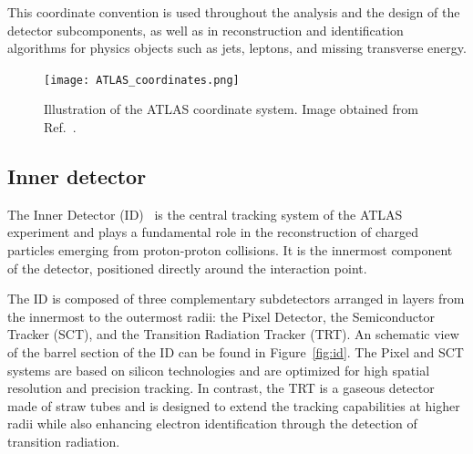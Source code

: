 This coordinate convention is used throughout the analysis and the design of the detector subcomponents, as well as in reconstruction and identification algorithms for physics objects such as jets, leptons, and missing transverse energy.
\begin{figure}[t]
    \centering
        \texttt{[image: ATLAS\_coordinates.png]}
    \caption{Illustration of the ATLAS coordinate system. Image obtained from Ref.~\cite{coordinates}.}
    \label{fig:coord}
\end{figure}

\subsection{Inner detector}
\label{sec:ID}


The Inner Detector (ID)~\cite{2010_id,ATLAS:exp} is the central tracking system of the ATLAS experiment and plays a fundamental role in the reconstruction of charged particles emerging from proton-proton collisions. It is the innermost component of the detector, positioned directly around the interaction point. 

The ID is composed of three complementary subdetectors arranged in layers from the innermost to the outermost radii: the Pixel Detector, the Semiconductor Tracker (SCT), and the Transition Radiation Tracker (TRT). An schematic view of the barrel section of the ID can be found in Figure~\ref{fig:id}.
The Pixel and SCT systems are based on silicon technologies and are optimized for high spatial resolution and precision tracking. In contrast, the TRT is a gaseous detector made of straw tubes and is designed to extend the tracking capabilities at higher radii while also enhancing electron identification through the detection of transition radiation.

